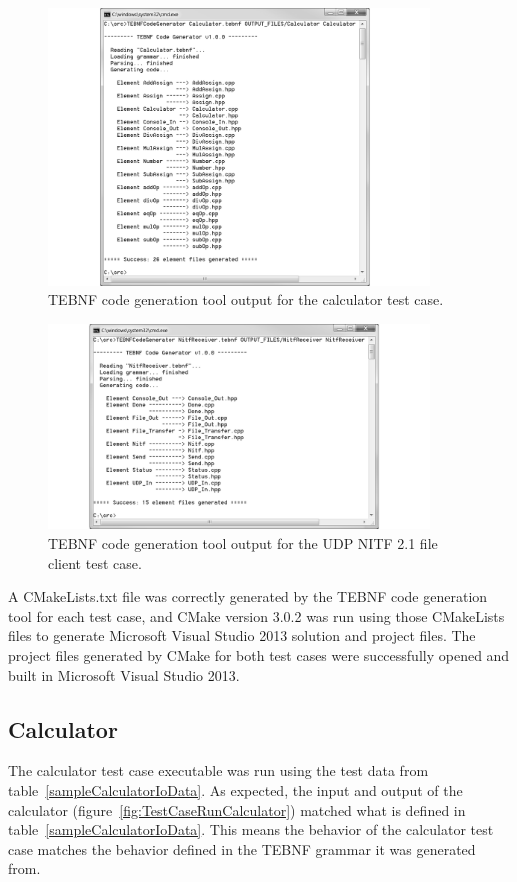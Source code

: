 \begin{figure}[h!]
\centering
\includegraphics[width=0.9\textwidth]{figures/TestCaseBuildCalculator.png}
\caption{TEBNF code generation tool output for the calculator test case.}
\label{fig:TestCaseBuildCalculator}
\end{figure}

\begin{figure}[h!]
\centering
\includegraphics[width=0.9\textwidth]{figures/TestCaseBuildNitfReceiver.png}
\caption{TEBNF code generation tool output for the UDP NITF 2.1 file client test case.}
\label{fig:TestCaseBuildNitfReceiver}
\end{figure}

\indent
A CMakeLists.txt file was correctly generated by the TEBNF code generation tool for each test case, and CMake version 3.0.2 was run using those CMakeLists files to generate Microsoft Visual Studio 2013 solution and project files.  The project files generated by CMake for both test cases were successfully opened and built in Microsoft Visual Studio 2013.

\subsection{Calculator}
\label{subsections:GeneratedCalculator}
The calculator test case executable was run using the test data from table~\ref{sampleCalculatorIoData}.  As expected, the input and output of the calculator (figure~\ref{fig:TestCaseRunCalculator}) matched what is defined in table~\ref{sampleCalculatorIoData}.  This means the behavior of the calculator test case matches the behavior defined in the TEBNF grammar it was generated from.

